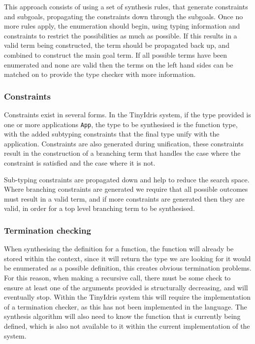 \documentclass[a4paper]{article}
\begin{document}
This approach consists of using a set of synthesis rules, that generate constraints 
and subgoals, propagating the constraints down through the subgoals. Once no more rules apply, the enumeration should begin, using 
typing information and constraints to restrict the possibilities as much as possible. If this results in a valid term being constructed, the term should be 
propagated back up, and combined to construct the main goal term. If all possible terms have been enumerated and none are valid then 
the terms on the left hand sides can be matched on to provide the type checker with more information. 

\subsubsection{Constraints}
\label{sec:org88fd160}
Constraints exist in several forms. In the TinyIdris system, if the type provided is one or more  
applications \texttt{App}, the type to be synthesised is the function type, with the added subtyping constraints that the final type unify with
the application. Constraints are also generated during unification, these constraints result in the construction of a 
branching term that handles the case where the constraint is satisfied and the case where it is not. 

Sub-typing constraints are propagated down and help to reduce the search space. Where branching constraints are 
generated we require that all possible outcomes must result in a valid term, and if more constraints are generated
then they are valid, in order for a top level branching term to be synthesised.
\subsubsection{Termination checking}
\label{sec:orgcec88d9}
When synthesising the definition for a function, the function will already be stored within the context, since it will 
return the type we are looking for it would be enumerated as a possible definition, this creates obvious termination 
problems. For this reason, when making a recursive call, there must be some check to ensure at least one of the 
arguments provided is structurally decreasing, and will eventually stop. Within the TinyIdris system this will require the 
implementation of a termination checker, as this has not been implemented in the language. The synthesis algorithm will also need to know 
the function that is currently being defined, which is also not available to it within the current implementation of the 
system. 
\end{document}
